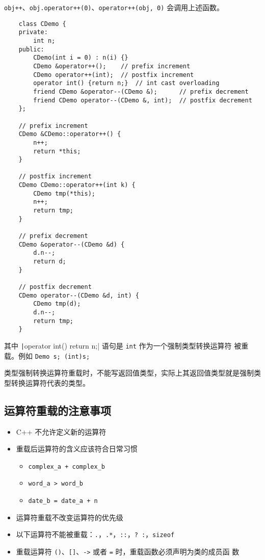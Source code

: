 \documentclass[UTF8]{ctexart}
\begin{document}
\texttt{obj++}、\texttt{obj.operator++(0)}、\texttt{operator++(obj, 0)}
会调用上述函数。

\begin{verbatim}
    class CDemo {
    private:
        int n;
    public:
        CDemo(int i = 0) : n(i) {}
        CDemo &operator++();    // prefix increment
        CDemo operator++(int);  // postfix increment
        operator int() {return n;}  // int cast overloading
        friend CDemo &operator--(CDemo &);      // prefix decrement
        friend CDemo operator--(CDemo &, int);  // postfix decrement
    };

    // prefix increment
    CDemo &CDemo::operator++() {
        n++;
        return *this;
    }

    // postfix increment
    CDemo CDemo::operator++(int k) {
        CDemo tmp(*this);
        n++;
        return tmp;
    }

    // prefix decrement
    CDemo &operator--(CDemo &d) {
        d.n--;
        return d;
    }

    // postfix decrement
    CDemo operator--(CDemo &d, int) {
        CDemo tmp(d);
        d.n--;
        return tmp;
    }
\end{verbatim}

其中 \texttt|operator int() {return n;}| 语句是 \texttt{int} 作为一个强制类型转换运算符
被重载。例如 \texttt{Demo s; (int)s;}

类型强制转换运算符重载时，不能写返回值类型，实际上其返回值类型就是强制类型转换运算符代表的类型。

\subsection{运算符重载的注意事项}
\begin{itemize}
    \item C++ 不允许定义新的运算符
    \item 重载后运算符的含义应该符合日常习惯
    \begin{itemize}
        \item \texttt{complex_a + complex_b}
        \item \texttt{word_a > word_b}
        \item \texttt{date_b = date_a + n}
    \end{itemize}
    \item 运算符重载不改变运算符的优先级
    \item 以下运算符不能被重载：\texttt{.}，\texttt{.*}，\texttt{::}，\texttt{? :}，\texttt{sizeof}
    \item 重载运算符 \texttt{()}、\texttt{[]}、\texttt{->} 或者 \texttt{=} 时，重载函数必须声明为类的成员函
    数
\end{itemize}
\end{document}
